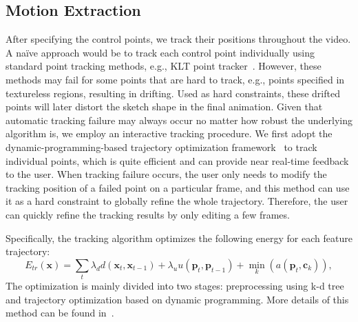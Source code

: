 \subsection{Motion Extraction}\label{sec:motion_extraction}
After specifying the control points, we track their positions throughout the video.
A na\"{i}ve approach would be to track each control point individually using standard point tracking methods, e.g., KLT point tracker~\cite{yilmaz2006object}. 
However, these methods may fail for some points that are hard to track, e.g., points specified in textureless regions, resulting in drifting. Used as hard constraints, these drifted points will later distort the sketch shape in the final animation.
Given that automatic tracking failure may always occur no matter how robust the underlying algorithm is,  
we employ an interactive tracking procedure. We first adopt the dynamic-programming-based trajectory optimization framework~\cite{Amberg:2011,Buchanan:2006} to track individual points, which is quite efficient and can provide near real-time feedback to the user. 
When tracking failure occurs, the user only needs to modify the tracking position of a failed point on a particular frame, and this method can use it as a hard constraint to globally refine the whole trajectory. Therefore, the user can quickly refine the tracking results by only editing a few frames.

Specifically, the tracking algorithm optimizes the following energy for each feature trajectory:
\begin{equation}\label{eq:tracking}
E_{tr}(\textbf{x}) = \sum_t\lambda_d d(\textbf{x}_t, \textbf{x}_{t-1})+\lambda_u u(\textbf{p}_t,\textbf{p}_{t-1})+\min_k(a(\textbf{p}_t,\textbf{c}_k)),
\end{equation}
The optimization is mainly divided into two stages: preprocessing using k-d tree and trajectory optimization based on dynamic programming. More details of this method can be found in~\cite{Amberg:2011,Buchanan:2006}.

